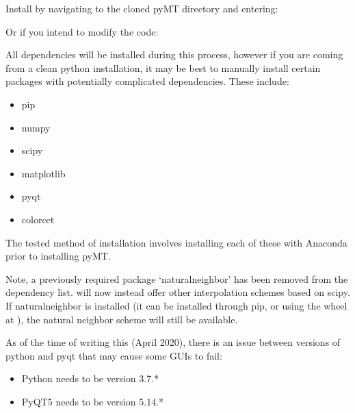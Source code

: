 \documentclass[letterpaper,10pt,english]{sphinxmanual}
\begin{document}
Install by navigating to the cloned pyMT directory and entering:

\begin{sphinxVerbatim}[commandchars=\\\{\}]
  
\end{sphinxVerbatim}

Or if you intend to modify the code:

\begin{sphinxVerbatim}[commandchars=\\\{\}]
  
\end{sphinxVerbatim}

All dependencies will be installed during this process, however if you are coming from a clean python installation, it may be best to manually install certain packages with potentially complicated dependencies.
These include:
\begin{itemize}
\item {} 
pip

\item {} 
numpy

\item {} 
scipy

\item {} 
matplotlib

\item {} 
pyqt

\item {} 
colorcet

\end{itemize}

The tested method of installation involves installing each of these with Anaconda prior to installing pyMT.

Note, a previously required package ‘naturalneighbor’ has been removed from the dependency list. {\hyperref[\detokenize{content/data_plot/main_window:data-plot}]{}} will now instead offer other interpolation schemes based on scipy. If naturalneighbor is installed (it can be installed through pip, or using the wheel at ), the natural neighbor scheme will still be available.

As of the time of writing this (April 2020), there is an issue between versions of python and pyqt that may cause some GUIs to fail:
\begin{itemize}
\item {} 
Python needs to be version 3.7.*

\item {} 
PyQT5 needs to be version 5.14.*

\end{itemize}
\end{document}
